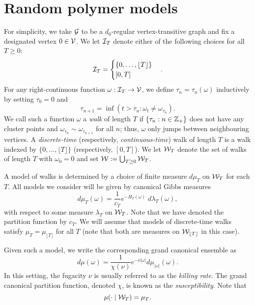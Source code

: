
\section{Random polymer models}

For simplicity, we take $\mathcal{G}$ to be a $d_0$-regular vertex-transitive graph and fix a
designated vertex $0 \in \mathcal{V}$. We let $\mathcal{I}_T$ denote either of the following
choices for all $T \ge 0$:
\begin{equation}
\mathcal{I}_T
  =
\begin{cases}
\{ 0, \ldots, \lfloor T \rfloor \} \\
[0, T]
\end{cases}.
\end{equation}
For any right-continuous function $\omega : \mathcal{I}_T \rightarrow \mathcal{V}$, we define
$\tau_n = \tau_n(\omega)$ inductively by setting $\tau_0 = 0$ and
\begin{equation}
\tau_{n+1} = \inf(t > \tau_n : \omega_t \ne \omega_{\tau_n}).
\end{equation}
We call such a function $\omega$ a \emph{walk} of length $T$ if $\{ \tau_n : n \in {\mathbb Z}_+ \}$
does not have any
cluster points and $\omega_{\tau_n} \sim \omega_{\tau_{n+1}}$ for all $n$; thus, $\omega$
only jumps between neighbouring vertices. A \emph{discrete-time} (respectively,
\emph{continuous-time}) walk of length $T$ is a walk indexed by $\{ 0, \ldots, \lfloor T \rfloor \}$
(respectively, $[0, T]$).
We let $\mathcal{W}_T$ denote the set of walks of length $T$ with $\omega_0 = 0$ and set
$\mathcal{W} := \bigcup_{T \geq 0} \mathcal{W}_T$.

A model of walks is determined by a choice of finite measure $d\mu_T$ on
$\mathcal{W}_T$ for each $T$. All models we consider will be given by canonical Gibbs measures
\begin{equation}
d\mu_T(\omega) = \frac{1}{c_T} e^{-H_T(\omega)} \; d\lambda_T(\omega),
\end{equation}
with respect to some measure $\lambda_T$ on $\mathcal{W}_T$. Note that we have denoted the
partition function by $c_T$.
We will assume that models of discrete-time walks satisfy
$\mu_T = \mu_{\lfloor T \rfloor}$ for all $T$ (note that both are measures on
$\mathcal{W}_{\lfloor T \rfloor}$ in this case).

Given such a model, we write the corresponding grand canonical ensemble as
\begin{equation}
d\mu(\omega) = \frac{1}{\chi(\nu)} e^{-\nu |\omega|} d\mu_{|\omega|}(\omega).
\end{equation}
In this setting, the fugacity $\nu$ is usually referred to as the \emph{killing rate}.
The grand canonical partition function, denoted $\chi$, is known as the \emph{susceptibility}.
Note that
\begin{equation}
\mu(\cdot \mid \mathcal{W}_T) = \mu_T.
\end{equation}

